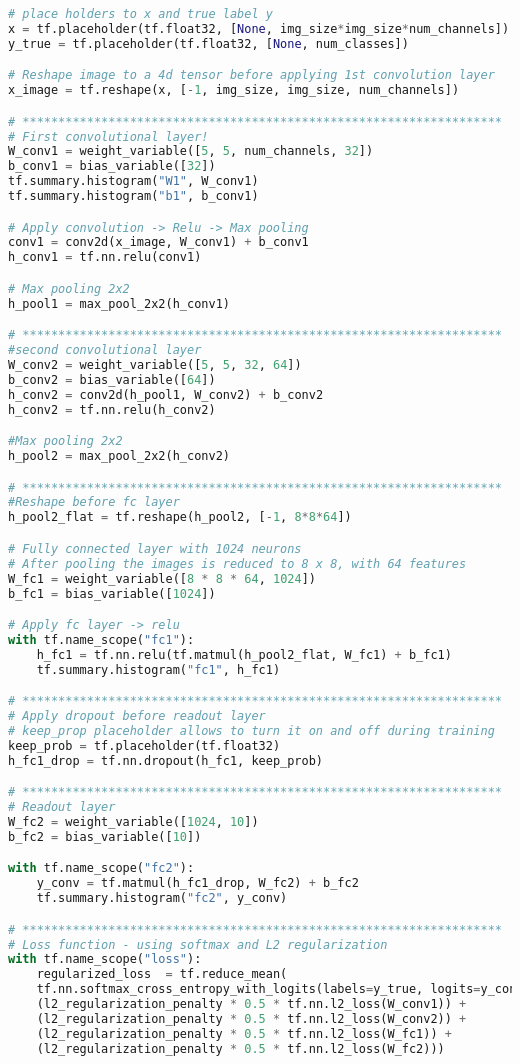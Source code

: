 \begin{lstlisting}[language=Python, label=lst:neuralnet.py, caption={neural\_net.py}, basicstyle=\tiny]
# place holders to x and true label y
x = tf.placeholder(tf.float32, [None, img_size*img_size*num_channels])
y_true = tf.placeholder(tf.float32, [None, num_classes])

# Reshape image to a 4d tensor before applying 1st convolution layer
x_image = tf.reshape(x, [-1, img_size, img_size, num_channels])

# *******************************************************************
# First convolutional layer!
W_conv1 = weight_variable([5, 5, num_channels, 32])
b_conv1 = bias_variable([32])
tf.summary.histogram("W1", W_conv1)
tf.summary.histogram("b1", b_conv1)

# Apply convolution -> Relu -> Max pooling
conv1 = conv2d(x_image, W_conv1) + b_conv1
h_conv1 = tf.nn.relu(conv1)

# Max pooling 2x2
h_pool1 = max_pool_2x2(h_conv1)

# *******************************************************************
#second convolutional layer
W_conv2 = weight_variable([5, 5, 32, 64])
b_conv2 = bias_variable([64])
h_conv2 = conv2d(h_pool1, W_conv2) + b_conv2
h_conv2 = tf.nn.relu(h_conv2)

#Max pooling 2x2
h_pool2 = max_pool_2x2(h_conv2)

# *******************************************************************
#Reshape before fc layer
h_pool2_flat = tf.reshape(h_pool2, [-1, 8*8*64])

# Fully connected layer with 1024 neurons
# After pooling the images is reduced to 8 x 8, with 64 features
W_fc1 = weight_variable([8 * 8 * 64, 1024])
b_fc1 = bias_variable([1024])

# Apply fc layer -> relu 
with tf.name_scope("fc1"):
	h_fc1 = tf.nn.relu(tf.matmul(h_pool2_flat, W_fc1) + b_fc1)
	tf.summary.histogram("fc1", h_fc1)

# *******************************************************************
# Apply dropout before readout layer
# keep_prop placeholder allows to turn it on and off during training
keep_prob = tf.placeholder(tf.float32)
h_fc1_drop = tf.nn.dropout(h_fc1, keep_prob)

# *******************************************************************
# Readout layer
W_fc2 = weight_variable([1024, 10])
b_fc2 = bias_variable([10])

with tf.name_scope("fc2"):
	y_conv = tf.matmul(h_fc1_drop, W_fc2) + b_fc2
	tf.summary.histogram("fc2", y_conv)

# *******************************************************************
# Loss function - using softmax and L2 regularization
with tf.name_scope("loss"):
	regularized_loss  = tf.reduce_mean(
	tf.nn.softmax_cross_entropy_with_logits(labels=y_true, logits=y_conv) +
	(l2_regularization_penalty * 0.5 * tf.nn.l2_loss(W_conv1)) +
	(l2_regularization_penalty * 0.5 * tf.nn.l2_loss(W_conv2)) +
	(l2_regularization_penalty * 0.5 * tf.nn.l2_loss(W_fc1)) + 
	(l2_regularization_penalty * 0.5 * tf.nn.l2_loss(W_fc2)))


\end{lstlisting}
